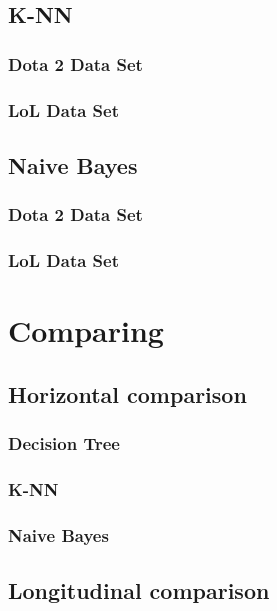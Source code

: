 \documentclass[sigconf]{acmart}
\begin{document}
\subsection{K-NN}

\subsubsection{Dota 2 Data Set }

\subsubsection{LoL Data Set}

\subsection{Naive Bayes}

\subsubsection{Dota 2 Data Set }

\subsubsection{LoL Data Set}

\section{Comparing}

\subsection{Horizontal comparison}

\subsubsection{Decision Tree }

\subsubsection{K-NN}

\subsubsection{Naive Bayes}

\subsection{Longitudinal comparison}
\end{document}

